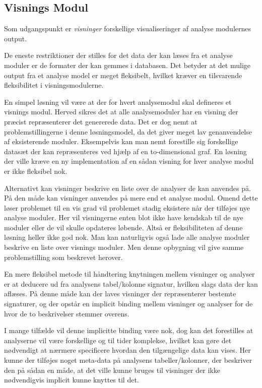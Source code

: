 \subsection{Visnings Modul}

Som udgangspunkt er \textit{visninger} forskellige visualiseringer af analyse modulernes output.

De eneste restriktioner der stilles for det data der kan læses fra et analyse moduler er de formater der kan gemmes i databasen.
Det betyder at det mulige output fra et analyse model er meget fleksibelt, hvilket kræver en tilsvarende fleksibilitet i visningsmodulerne.

En simpel løsning vil være at der for hvert analysemodul skal defineres et visnings modul.
Herved sikres det at alle analysemoduler har en visning der præcist repræsenterer det genererede data.
Det er dog nemt at problemstillingerne i denne løsningsmodel, da det giver meget lav genanvendelse af eksisterende moduler.
Eksempelvis kan man nemt forestille sig forskellige datasæt der kan repræsenteres ved hjælp af en to-dimensional graf.
En løsning der ville kræve en ny implementation af en sådan visning for hver analyse modul er ikke fleksibel nok.

Alternativt kan visninger beskrive en liste over de analyser de kan anvendes på.
På den måde kan visninger anvendes på mere end et analyse modul.
Omend dette løser problemet til en vis grad vil problemet stadig eksistere når der tilføjes nye analyse moduler.
Her vil visningerne enten blot ikke have kendskab til de nye moduler eller de vil skulle opdateres løbende.
Altså er fleksibiliteten af denne løsning heller ikke god nok.
Man kan naturligvis også lade alle analyse moduler beskrive en liste over visnings moduler.
Men denne opbygning vil give samme problemstilling som beskrevet herover.

En mere fleksibel metode til håndtering knytningen mellem visninger og analyser er at deducere ud fra analysens tabel/kolonne signatur, hvilken slags data der kan aflæses.
På denne måde kan der laves visninger der repræsenterer bestemte signaturer, og der opstår en implicit binding mellem visninger og analyser for de hvor de to beskrivelser stemmer overens.

I mange tilfælde vil denne implicitte binding være nok, dog kan det forestilles at analyserne vil være forskellige og til tider komplekse, hvilket kan gøre det nødvendigt at nærmere specificere hvordan den tilgængelige data kan vises.
Her kunne der tilføjes noget meta-data på analysens tabeller/kolonner, der beskriver den på sådan en måde, at det ville kunne bruges til visninger der ikke nødvendigvis implicit kunne knyttes til det.

